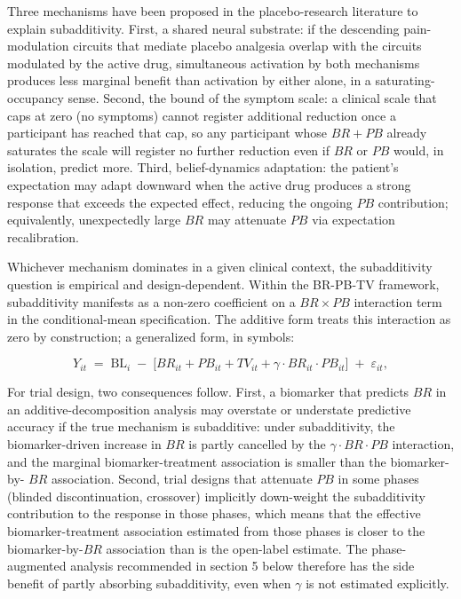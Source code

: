 \documentclass[
  11pt,
]{article}
\begin{document}
Three mechanisms have been proposed in the placebo-research literature to
explain subadditivity. First, a shared neural substrate: if the descending
pain-modulation circuits that mediate placebo analgesia overlap with the
circuits modulated by the active drug, simultaneous activation by both
mechanisms produces less marginal benefit than activation by either alone, in
a saturating-occupancy sense. Second, the bound of the symptom scale: a
clinical scale that caps at zero (no symptoms) cannot register additional
reduction once a participant has reached that cap, so any participant whose
\(BR + PB\) already saturates the scale will register no further reduction even
if \(BR\) or \(PB\) would, in isolation, predict more. Third, belief-dynamics
adaptation: the patient's expectation may adapt downward when the active drug
produces a strong response that exceeds the expected effect, reducing the
ongoing \(PB\) contribution; equivalently, unexpectedly large \(BR\) may attenuate
\(PB\) via expectation recalibration.

Whichever mechanism dominates in a given clinical context, the subadditivity
question is empirical and design-dependent. Within the BR-PB-TV framework,
subadditivity manifests as a non-zero coefficient on a \(BR \times PB\)
interaction term in the conditional-mean specification. The additive form
treats this interaction as zero by construction; a generalized form, in
symbols:

\[ Y_{it} \;=\; \mathrm{BL}_i \;-\; \bigl[BR_{it} + PB_{it} + TV_{it} + \gamma
\cdot BR_{it} \cdot PB_{it}\bigr] \;+\; \varepsilon_{it}, \]

For trial design, two consequences follow. First, a biomarker that predicts
\(BR\) in an additive-decomposition analysis may overstate or understate
predictive accuracy if the true mechanism is subadditive: under subadditivity,
the biomarker-driven increase in \(BR\) is partly cancelled by the \(\gamma \cdot
BR \cdot PB\) interaction, and the marginal biomarker-treatment association is
smaller than the biomarker-by- \(BR\) association. Second, trial designs that
attenuate \(PB\) in some phases (blinded discontinuation, crossover) implicitly
down-weight the subadditivity contribution to the response in those phases,
which means that the effective biomarker-treatment association estimated from
those phases is closer to the biomarker-by-\(BR\) association than is the
open-label estimate. The phase-augmented analysis recommended in section 5
below therefore has the side benefit of partly absorbing subadditivity, even
when \(\gamma\) is not estimated explicitly.
\end{document}
